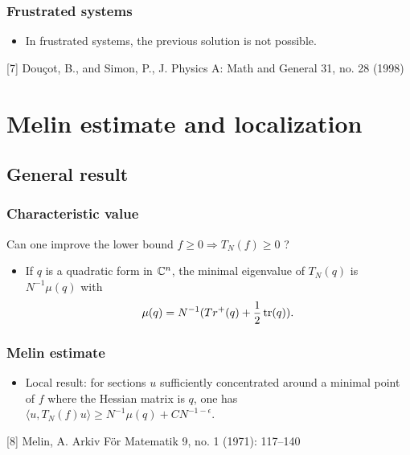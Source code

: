 \documentclass[mathserif]{beamer}
\begin{document}
\begin{frame}
  \frametitle{Frustrated systems}
  \begin{itemize}
  \item In frustrated systems, the previous solution is not possible.
  \end{itemize}
\vspace{1em}

\small{[7] Douçot, B., and Simon, P.,  J. Physics A: Math and General 31, no. 28 (1998)}

\end{frame}

\section{Melin estimate and localization}
\subsection{General result}
\begin{frame}
  \frametitle{Characteristic value}
  Can one improve the lower bound $f\geq 0\Rightarrow T_N(f)\geq 0$ ?
  \begin{itemize}
  \item If $q$ is a quadratic form in $\mathbb{C}^n$, the minimal eigenvalue
    of $T_N(q)$ is $N^{-1}\mu(q)$ with $$\mu(q)=N^{-1}(Tr^+(q)+\frac
    12 \operatorname{tr}(q)).$$

\end{itemize}
\end{frame}

\begin{frame}
\frametitle{Melin estimate}
\begin{itemize}
  \item Local result: for sections $u$ sufficiently concentrated around a
    minimal point of $f$ where the Hessian matrix is $q$, one has $\langle
    u,T_N(f)u\rangle \geq N^{-1}\mu(q)+CN^{-1-\epsilon}$.
  \end{itemize}

\small{
[8] Melin, A. Arkiv För Matematik 9, no. 1 (1971): 117–140}

\end{frame}
\end{document}
